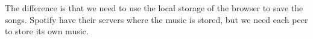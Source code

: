 The difference is that we need to use the local storage of the browser to save the songs.
Spotify have their servers where the music is stored, but we need each peer to store its own music.

